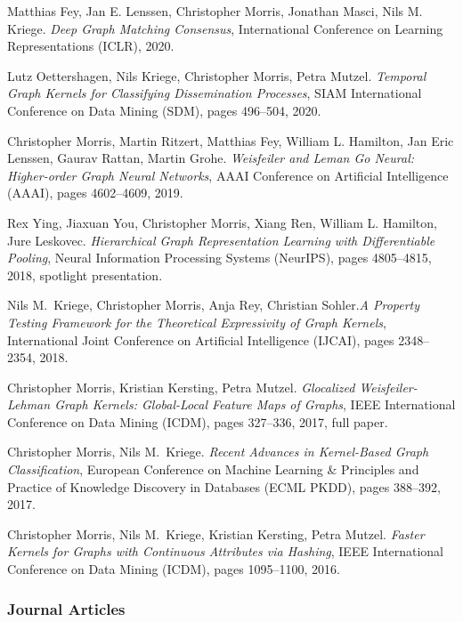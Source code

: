 \documentclass[11pt, a4paper, DIV=12]{scrartcl}
\begin{document}
\begin{thebibliography}{15}
	Matthias Fey, Jan E. Lenssen, Christopher Morris, Jonathan Masci, Nils M. Kriege.
    \emph{Deep Graph Matching Consensus},
	International Conference on Learning Representations (ICLR), 2020.
	
	Lutz Oettershagen, Nils Kriege, Christopher Morris, Petra Mutzel.
	\emph{Temporal Graph Kernels for Classifying Dissemination Processes},
	SIAM International Conference on Data Mining (SDM), pages 496--504, 2020.
	
	Christopher Morris, Martin Ritzert, Matthias Fey, William L. Hamilton, Jan Eric Lenssen, Gaurav Rattan, Martin Grohe.
	\newblock \emph{Weisfeiler and Leman Go Neural: Higher-order Graph Neural Networks},
	\newblock AAAI Conference on Artificial Intelligence (AAAI), pages 4602--4609, 2019.
	
	Rex Ying, Jiaxuan You, Christopher Morris, Xiang Ren, William L. Hamilton, Jure Leskovec.
	\emph{Hierarchical Graph Representation Learning with Differentiable Pooling},
	Neural Information Processing Systems (NeurIPS), pages 4805--4815, 2018, spotlight presentation.
	
	Nils M.~Kriege, Christopher Morris, Anja Rey, Christian Sohler.\footnotemark[2]
	\emph{A Property Testing Framework for the Theoretical Expressivity of Graph Kernels},
	International Joint Conference on Artificial Intelligence (IJCAI), pages 2348--2354, 2018.
	
    Christopher Morris, Kristian Kersting, Petra Mutzel.
	\emph{Glocalized Weisfeiler-Lehman Graph Kernels: Global-Local Feature Maps of Graphs},
	IEEE International Conference on Data Mining (ICDM), pages 327--336, 2017, full paper.
	
	Christopher Morris, Nils M.~Kriege.
	\emph{Recent Advances in Kernel-Based Graph Classification},
	European Conference on Machine Learning \& Principles and Practice of Knowledge Discovery in Databases (ECML PKDD), pages 388--392, 2017.
	
    Christopher Morris, Nils M.~Kriege, Kristian Kersting, Petra Mutzel.
	\emph{Faster Kernels for Graphs with Continuous Attributes via Hashing},
	IEEE International Conference on Data Mining (ICDM), pages 1095--1100, 2016.
\subsubsection*{Journal Articles}


\end{thebibliography}
\end{document}
